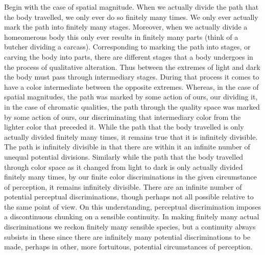 Begin with the case of spatial magnitude. When we actually divide the path that the body travelled, we only ever do so finitely many times. We only ever actually mark the path into finitely many stages. Moreover, when we actually divide a homeomerous body this only ever results in finitely many parts (think of a butcher dividing a carcass). Corresponding to marking the path into stages, or carving the body into parts, there are different stages that a body undergoes in the process of qualitative alteration. Thus between the extremes of light and dark the body must pass through intermediary stages. During that process it comes to have a color intermediate between the opposite extremes. Whereas, in the case of spatial magnitudes, the path was marked by some action of ours, our dividing it, in the case of chromatic qualities, the path through the quality space was marked by some action of ours, our discriminating that intermediary color from the lighter color that preceded it. While the path that the body travelled is only actually divided finitely many times, it remains true that it is infinitely divisible. The path is infinitely divisible in that there are within it an infinite number of unequal potential divisions. Similarly while the path that the body travelled through color space as it changed from light to dark is only actually divided finitely many times, by our finite color discriminations in the given circumstance of perception, it remains infinitely divisible. There are an infinite number of potential perceptual discriminations, though perhaps not all possible relative to the same point of view. On this understanding, perceptual discrimination imposes a discontinuous chunking on a sensible continuity. In making finitely many actual discriminations we reckon finitely many sensible species, but a continuity always subsists in these since there are infinitely many potential discriminations to be made, perhaps in other, more fortuitous, potential circumstances of perception.

